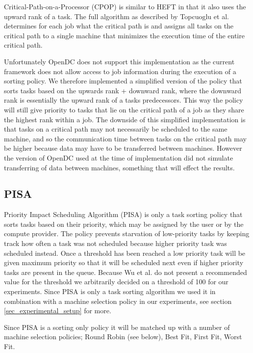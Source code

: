 \documentclass[twocolumn,a4]{scrartcl}
\begin{document}
Critical-Path-on-a-Processor (CPOP) is similar to HEFT in that it also uses the upward rank of a task. The full algorithm as described by Topcuoglu et al. \cite{DBLP:conf/hcw/TopcuogluHW99} determines for each job what the critical path is and assigns all tasks on the critical path to a single machine that minimizes the execution time of the entire critical path.

Unfortunately OpenDC does not support this implementation as the current framework does not allow access to job information during the execution of a sorting policy. We therefore implemented a simplified version of the policy that sorts tasks based on the upwards rank + downward rank, where the downward rank is essentially the upward rank of a tasks predecessors. This way the policy will still give priority to tasks that lie on the critical path of a job as they share the highest rank within a job. The downside of this simplified implementation is that tasks on a critical path may not necessarily be scheduled to the same machine, and so the communication time between tasks on the critical path may be higher because data may have to be transferred between machines. However the version of OpenDC used at the time of implementation did not simulate transferring of data between machines, something that will effect the results.


\subsection{PISA} \label{sec_pisa}

Priority Impact Scheduling Algorithm (PISA) is only a task sorting policy that sorts tasks based on their priority, which may be assigned by the user or by the compute provider. The policy prevents starvation of low-priority tasks by keeping track how often a task was not scheduled because higher priority task was scheduled instead. Once a threshold has been reached a low priority task will be given maximum priority so that it will be scheduled next even if higher priority tasks are present in the queue. Because Wu et al. \cite{6174855} do not present a recommended value for the threshold we arbitrarily decided on a threshold of 100 for our experiments. Since PISA is only a task sorting algorithm we used it in combination with a machine selection policy in our experiments, see section \ref{sec_experimental_setup}  for more.

Since PISA is a sorting only policy it will be matched up with a number of machine selection policies; Round Robin (see below), Best Fit, First Fit, Worst Fit.
\end{document}

